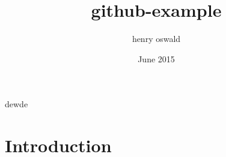 \documentclass{article}
\title{github-example}
\author{henry oswald}
\date{June 2015}
\begin{document}
dewde
\maketitle

\section{Introduction}
\end{document}
